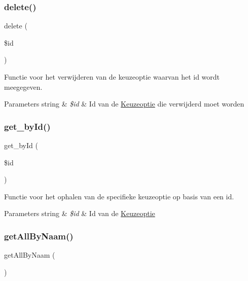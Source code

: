 \subsubsection{\texorpdfstring{delete()}{delete()}}
{\footnotesize\ttfamily delete (\begin{DoxyParamCaption}\item[{}]{\$id }\end{DoxyParamCaption})}

Functie voor het verwijderen van de keuzeoptie waarvan het id wordt meegegeven. 
\begin{DoxyParams}[1]{Parameters}
string & {\em \$id} & Id van de \mbox{\hyperlink{class_keuzeoptie}{Keuzeoptie}} die verwijderd moet worden \\
\hline
\end{DoxyParams}
\mbox{\label{class_keuzeoptie___model_a98d28a4d9a29d40c5a8aa0176f19a919}} 
\subsubsection{\texorpdfstring{get\+\_\+by\+Id()}{get\_byId()}}
{\footnotesize\ttfamily get\+\_\+by\+Id (\begin{DoxyParamCaption}\item[{}]{\$id }\end{DoxyParamCaption})}

Functie voor het ophalen van de specifieke keuzeoptie op basis van een id. 
\begin{DoxyParams}[1]{Parameters}
string & {\em \$id} & Id van de \mbox{\hyperlink{class_keuzeoptie}{Keuzeoptie}} \\
\hline
\end{DoxyParams}
\mbox{\label{class_keuzeoptie___model_a2b035b1ffd1cbe651b35bb3e53d72c09}} 
\subsubsection{\texorpdfstring{get\+All\+By\+Naam()}{getAllByNaam()}}
{\footnotesize\ttfamily get\+All\+By\+Naam (\begin{DoxyParamCaption}{ }\end{DoxyParamCaption})}




